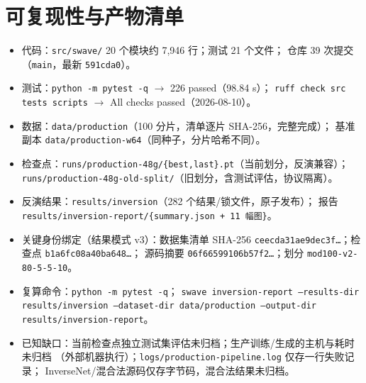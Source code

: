 \documentclass[UTF8,a4paper,11pt]{ctexart}
\begin{document}
\appendix
\section{可复现性与产物清单}\label{app:repro}
\begin{sloppypar}
\begin{itemize}
\item 代码：\texttt{src/swave/} 20 个模块约 7{,}946 行；测试 21 个文件；
      仓库 39 次提交（\texttt{main}，最新 \texttt{591cda0}）。
\item 测试：\texttt{python -m pytest -q} \(\to\) 226 passed（98.84 s）；
      \texttt{ruff check src tests scripts} \(\to\) All checks passed（2026-08-10）。
\item 数据：\texttt{data/production}（100 分片，清单逐片 SHA-256，完整完成）；
      基准副本 \texttt{data/production-w64}（同种子，分片哈希不同）。
\item 检查点：\texttt{runs/production-48g/\{best,last\}.pt}（当前划分，反演兼容）；
      \texttt{runs/production-48g-old-split/}（旧划分，含测试评估，协议隔离）。
\item 反演结果：\texttt{results/inversion}（282 个结果/锁文件，原子发布）；
      报告 \texttt{results/inversion-report/\{summary.json + 11 幅图\}}。
\item 关键身份绑定（结果模式 v3）：数据集清单 SHA-256
      \texttt{ceecda31ae9dec3f\ldots}；检查点 \texttt{b1a6fc08a40ba648\ldots}；
      源码摘要 \texttt{06f66599106b57f2\ldots}；划分 \texttt{mod100-v2-80-5-5-10}。
\item 复算命令：\texttt{python -m pytest -q}；
      \texttt{swave inversion-report --results-dir results/inversion
      --dataset-dir data/production --output-dir results/inversion-report}。
\item 已知缺口：当前检查点独立测试集评估未归档；生产训练/生成的主机与耗时未归档
      （外部机器执行）；\texttt{logs/production-pipeline.log} 仅存一行失败记录；
      InverseNet/混合法源码仅存字节码，混合法结果未归档。
\end{itemize}
\end{sloppypar}
\end{document}

